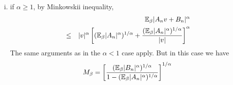 \documentclass{article}
\begin{document}
\begin{enumerate}[(i)]
\item if $\alpha \geq 1$, by Minkowskii inequality,
  \begin{eqnarray*}
    && \mathbb{E}_\beta |A_n v + B_n|^\alpha \\
    &\leq& |v|^\alpha\left[
      (\mathbb{E}_\beta|A_n|^\alpha)^{1/\alpha} + {(\mathbb{E}_\beta
        |A_n|^\alpha)^{1/\alpha} \over |v|}
    \right]^\alpha
  \end{eqnarray*}
  The same arguments as in the $\alpha < 1$ case apply. But in this
  case we have
  \[
  M_\beta = \left[{
    (\mathbb{E}_\beta |B_n|^\alpha)^{1/\alpha}
    \over
    1 - (\mathbb{E}_\beta|A_n|^\alpha)^{1/\alpha}
  }\right]^{1/\alpha}
\]
\end{enumerate}


\end{document}
